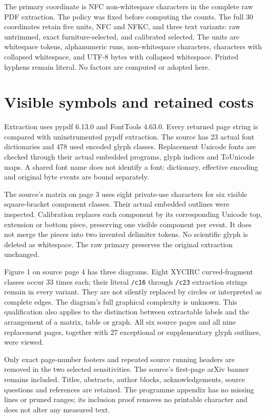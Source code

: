 \documentclass[11pt,a4paper]{article}
\begin{document}
The primary coordinate is NFC non-whitespace characters in the complete
raw PDF extraction. The policy was fixed before computing the counts.
The full 30 coordinates retain five units, NFC and NFKC, and three text
variants: raw untrimmed, exact furniture-selected, and calibrated selected.
The units are whitespace tokens, alphanumeric runs, non-whitespace
characters, characters with collapsed whitespace, and UTF-8 bytes with
collapsed whitespace. Printed hyphens remain literal. No factors are
computed or adopted here.

\newpage
\section*{Visible symbols and retained costs}
Extraction uses pypdf 6.13.0 and FontTools 4.63.0. Every returned page
string is compared with uninstrumented pypdf extraction. The source has
23 actual font dictionaries and 478 used encoded glyph classes. Replacement
Unicode fonts are checked through their actual embedded programs, glyph
indices and ToUnicode maps. A shared font name does not identify a font:
dictionary, effective encoding and original byte events are bound separately.

The source's matrix on page 3 uses eight private-use characters for six
visible square-bracket component classes. Their actual embedded outlines
were inspected. Calibration replaces each component by its corresponding
Unicode top, extension or bottom piece, preserving one visible component
per event. It does not merge the pieces into two invented delimiter tokens.
No scientific glyph is deleted as whitespace. The raw primary preserves
the original extraction unchanged.

Figure 1 on source page 4 has three diagrams. Eight XYCIRC curved-fragment
classes occur 33 times each; their literal \texttt{/c16} through
\texttt{/c23} extraction strings remain in every variant. They are not
silently replaced by circles or interpreted as complete edges. The diagram's
full graphical complexity is unknown. This qualification also applies to
the distinction between extractable labels and the arrangement of a matrix,
table or graph. All six source pages and all nine replacement pages,
together with 27 exceptional or supplementary glyph outlines, were viewed.

Only exact page-number footers and repeated source running headers are
removed in the two selected sensitivities. The source's first-page arXiv
banner remains included. Titles, abstracts, author blocks, acknowledgements,
source questions and references are retained. The programme appendix has
no missing lines or pruned ranges; its inclusion proof removes no printable
character and does not alter any measured text.
\end{document}
